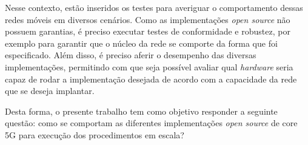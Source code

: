 Nesse contexto, estão inseridos os testes para averiguar o comportamento dessas redes móveis em diversos cenários.
Como as implementações \textit{open source} não possuem garantias, é preciso executar testes de conformidade e robustez, por exemplo para garantir que o núcleo da rede se comporte da forma que foi especificado.
Além disso, é preciso aferir o desempenho das diversas implementações, permitindo com que seja possível avaliar qual \textit{hardware} seria capaz de rodar a implementação desejada de acordo com a capacidade da rede que se deseja implantar.

Desta forma, o presente trabalho tem como objetivo responder a seguinte questão: como se comportam as diferentes implementações \textit{open source} de core 5G para execução dos procedimentos em escala?
